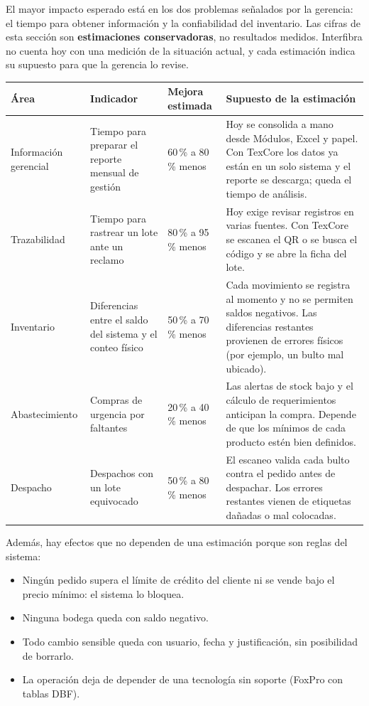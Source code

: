 \documentclass[11pt,a4paper]{article}
\newcommand{\encabezado}{\rowcolor{fondo}}
\begin{document}
El mayor impacto esperado está en los dos problemas señalados por la gerencia: el tiempo para obtener información y la confiabilidad del inventario. Las cifras de esta sección son \textbf{estimaciones conservadoras}, no resultados medidos. Interfibra no cuenta hoy con una medición de la situación actual, y cada estimación indica su supuesto para que la gerencia lo revise.

\begin{center}
\small
\begin{tabularx}{\textwidth}{P{2.4cm}P{3.4cm}P{2.1cm}L}
\toprule
\encabezado \textbf{Área} & \textbf{Indicador} & \textbf{Mejora estimada} & \textbf{Supuesto de la estimación} \\
\midrule
Información gerencial & Tiempo para preparar el reporte mensual de gestión & 60\,\% a 80\,\% menos & Hoy se consolida a mano desde Módulos, Excel y papel. Con TexCore los datos ya están en un solo sistema y el reporte se descarga; queda el tiempo de análisis. \\
Trazabilidad & Tiempo para rastrear un lote ante un reclamo & 80\,\% a 95\,\% menos & Hoy exige revisar registros en varias fuentes. Con TexCore se escanea el QR o se busca el código y se abre la ficha del lote. \\
Inventario & Diferencias entre el saldo del sistema y el conteo físico & 50\,\% a 70\,\% menos & Cada movimiento se registra al momento y no se permiten saldos negativos. Las diferencias restantes provienen de errores físicos (por ejemplo, un bulto mal ubicado). \\
Abastecimiento & Compras de urgencia por faltantes & 20\,\% a 40\,\% menos & Las alertas de stock bajo y el cálculo de requerimientos anticipan la compra. Depende de que los mínimos de cada producto estén bien definidos. \\
Despacho & Despachos con un lote equivocado & 50\,\% a 80\,\% menos & El escaneo valida cada bulto contra el pedido antes de despachar. Los errores restantes vienen de etiquetas dañadas o mal colocadas. \\
\bottomrule
\end{tabularx}
\end{center}

Además, hay efectos que no dependen de una estimación porque son reglas del sistema:

\begin{itemize}
  \item Ningún pedido supera el límite de crédito del cliente ni se vende bajo el precio mínimo: el sistema lo bloquea.
  \item Ninguna bodega queda con saldo negativo.
  \item Todo cambio sensible queda con usuario, fecha y justificación, sin posibilidad de borrarlo.
  \item La operación deja de depender de una tecnología sin soporte (FoxPro con tablas DBF).
\end{itemize}
\end{document}
